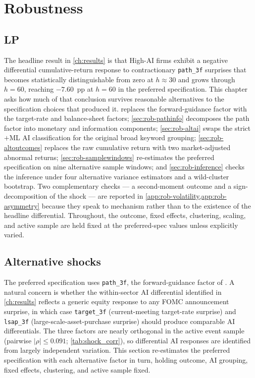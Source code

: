 \chapter{Robustness}
\label{ch:robustness}

\section{LP}

The headline result in \cref{ch:results} is that High-AI firms exhibit
a negative differential cumulative-return response to contractionary
\texttt{path\_3f} surprises that becomes statistically distinguishable
from zero at $h \approx 30$ and grows through $h = 60$, reaching
$-7.60$~pp at $h = 60$ in the preferred specification. This chapter
asks how much of that conclusion survives reasonable alternatives to
the specification choices that produced it. 
replaces the forward-guidance factor with the target-rate and
balance-sheet factors; \cref{sec:rob-pathinfo} decomposes the path
factor into monetary and information components;
\cref{sec:rob-altai} swaps the strict$+$ML AI classification for the
original broad keyword grouping; \cref{sec:rob-altoutcomes} replaces
the raw cumulative return with two market-adjusted abnormal returns;
\cref{sec:rob-samplewindows} re-estimates the preferred specification
on nine alternative sample windows; and \cref{sec:rob-inference}
checks the inference under four alternative variance estimators and
a wild-cluster bootstrap. Two complementary checks --- a
second-moment outcome and a sign-decomposition of the shock --- are
reported in \cref{app:rob-volatility,app:rob-asymmetry} because they
speak to mechanism rather than to the existence of the headline
differential. Throughout, the outcome, fixed effects, clustering,
scaling, and active sample are held fixed at the preferred-spec
values unless explicitly varied.

\section{Alternative shocks}
\label{sec:rob-altshocks}

The preferred specification uses \texttt{path\_3f}, the
forward-guidance factor of \citet{swanson2021}. A natural concern is
whether the within-sector AI differential identified in
\cref{ch:results} reflects a generic equity response to any FOMC
announcement surprise, in which case \texttt{target\_3f}
(current-meeting target-rate surprise) and \texttt{lsap\_3f}
(large-scale-asset-purchase surprise) should produce comparable AI
differentials. The three factors are nearly orthogonal in the active
event sample (pairwise $|\rho| \leq 0.091$; \cref{tab:shock_corr}),
so differential AI responses are identified from largely independent
variation. This section re-estimates the preferred specification with
each alternative factor in turn, holding outcome, AI grouping, fixed
effects, clustering, and active sample fixed.

